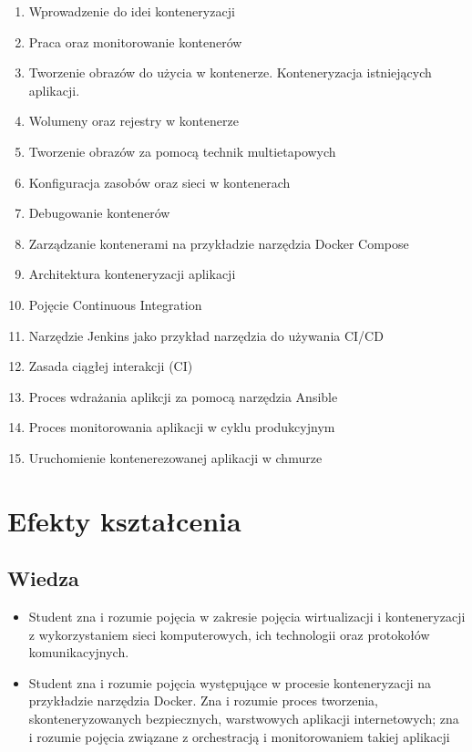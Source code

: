 \documentclass[12pt, a4paper]{article}
\begin{document}
\begin{enumerate}
  \item Wprowadzenie do idei konteneryzacji
  \item Praca oraz monitorowanie kontenerów
  \item Tworzenie obrazów do użycia w kontenerze. Konteneryzacja istniejących aplikacji.
  \item Wolumeny oraz rejestry  w kontenerze
  \item Tworzenie obrazów za pomocą technik multietapowych
  \item Konfiguracja zasobów oraz sieci w kontenerach
  \item Debugowanie kontenerów
  \item Zarządzanie kontenerami na przykładzie narzędzia Docker Compose
  \item Architektura konteneryzacji aplikacji
  \item Pojęcie Continuous Integration
  \item Narzędzie Jenkins jako przykład narzędzia do używania CI/CD
  \item Zasada ciągłej interakcji (CI)
  \item Proces wdrażania aplikcji za pomocą narzędzia Ansible
  \item Proces monitorowania aplikacji w cyklu produkcyjnym
  \item Uruchomienie kontenerezowanej aplikacji w chmurze
\end{enumerate}

\section{Efekty kształcenia}

\subsection*{Wiedza}
\begin{itemize}
  \item Student zna i rozumie pojęcia w zakresie pojęcia wirtualizacji i konteneryzacji z wykorzystaniem sieci komputerowych, ich technologii oraz protokołów komunikacyjnych.
  \item Student zna i rozumie pojęcia występujące w procesie konteneryzacji na przykładzie narzędzia Docker. Zna i rozumie proces tworzenia, skonteneryzowanych bezpiecznych, warstwowych aplikacji internetowych; zna i rozumie pojęcia związane z orchestracją i monitorowaniem takiej aplikacji
\end{itemize}
\end{document}
